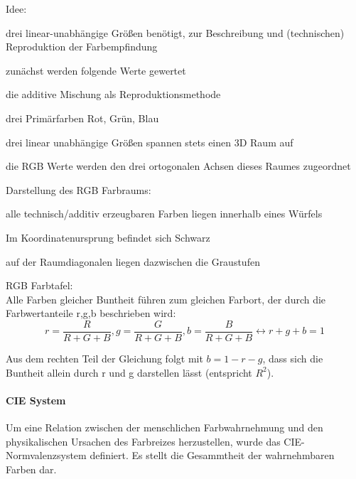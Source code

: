 \documentclass[landscape]{article}
\begin{document}
\begin{multicols}{3}
  Idee:
  \begin{itemize*}
    \item drei linear-unabhängige Größen benötigt, zur Beschreibung und (technischen) Reproduktion der Farbempfindung
    \item zunächst werden folgende Werte gewertet
    \begin{itemize*}
    \item die additive Mischung als Reproduktionsmethode
    \item drei Primärfarben Rot, Grün, Blau
    \item drei linear unabhängige Größen spannen stets einen 3D Raum auf
    \end{itemize*}
    \item die RGB Werte werden den drei ortogonalen Achsen dieses Raumes zugeordnet
  \end{itemize*}
  
  Darstellung des RGB Farbraums:
  \begin{itemize*}
    \item alle technisch/additiv erzeugbaren Farben liegen innerhalb eines Würfels
    \item Im Koordinatenursprung befindet sich Schwarz
    \item auf der Raumdiagonalen liegen dazwischen die Graustufen
  \end{itemize*}
  
  RGB Farbtafel:\\
  Alle Farben gleicher Buntheit führen zum gleichen Farbort, der durch die Farbwertanteile r,g,b beschrieben wird:
  $$r=\frac{R}{R+G+B}, g=\frac{G}{R+G+B}, b=\frac{B}{R+G+B} \leftrightarrow r+g+b=1$$
  
  Aus dem rechten Teil der Gleichung folgt mit $b=1-r-g$, dass sich die Buntheit allein durch r und g darstellen lässt (entspricht $R^2$).  
  
  \paragraph{CIE System}
  Um eine Relation zwischen der menschlichen Farbwahrnehmung und den physikalischen Ursachen des Farbreizes herzustellen, wurde das CIE-Normvalenzsystem definiert. Es stellt die Gesammtheit der wahrnehmbaren Farben dar.
  

\end{multicols}
\end{document}
